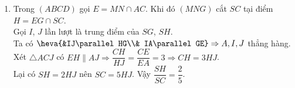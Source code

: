 \begin{ex}
{\begin{enumerate}
\\
$\Rightarrow KO \parallel SA$ (vì $KO$ là đường trung bình của $\triangle SAC$). \hfill (4)
\\
Mà $O\in BD \subset (KBD)$ nên $KO\subset (SBD)$ và $SA\not\subset (KBD)$.  \hfill (5)
\\
Từ (4), (5) suy ra $SA \parallel (KBD)$.
\item Trong $(ABCD)$ gọi $E=MN\cap AC$. Khi đó $(MNG)$ cắt $SC$ tại điểm $H=EG\cap SC$.
\\
Gọi $I$, $J$ lần lượt là trung điểm của $SG$, $SH$.
\\
Ta có $\heva{&IJ\parallel HG\\& IA\parallel GE}\Rightarrow A,I,J$ thẳng hàng.
\\
Xét $\triangle ACJ$ có $EH\parallel AJ \Rightarrow \dfrac{CH}{HJ}=\dfrac{CE}{EA}=3 \Rightarrow CH=3HJ$.
\\
Lại có $SH=2HJ$ nên $SC=5HJ$. Vậy $\dfrac{SH}{SC}=\dfrac{2}{5}$.
\end{enumerate}
}
\end{ex}
